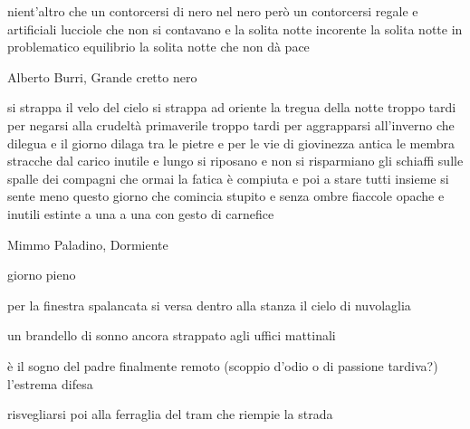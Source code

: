 \begin{poem}
	\begin{stanza}
		nient’altro che\verseline
		un contorcersi di nero nel nero\verseline
		però un contorcersi regale\verseline
		e artificiali lucciole che non si contavano\verseline
		e la solita notte incorente\verseline
		la solita notte in problematico equilibrio\verseline
		la solita notte che non dà pace
	\end{stanza}
\end{poem}

\clearpage


\begin{artItem}
	Alberto Burri, Grande cretto nero
\end{artItem}

\begin{poem}
	\begin{stanza}
		si strappa il velo del cielo\verseline
		si strappa ad oriente la tregua della notte\verseline
		troppo tardi per negarsi alla crudeltà primaverile\verseline
		troppo tardi per aggrapparsi all'inverno che dilegua\verseline
		e il giorno dilaga tra le pietre\verseline
		e per le vie di giovinezza antica\verseline
		le membra stracche dal carico inutile e lungo\verseline
		si riposano\verseline
		e non si risparmiano gli schiaffi sulle spalle dei compagni\verseline
		che ormai la fatica è compiuta\verseline
		e poi a stare tutti insieme si sente meno\verseline
		questo giorno che comincia stupito e senza ombre\verseline
		fiaccole opache e inutili\verseline
		estinte a una a una\verseline
		con gesto di carnefice
	\end{stanza}
\end{poem}

\clearpage


\begin{artItem}
	Mimmo Paladino, Dormiente
\end{artItem}

\begin{poem}
	\begin{stanza}
		giorno pieno
	\end{stanza}

	\begin{stanza}
		per la finestra spalancata\verseline
		si versa dentro alla stanza\verseline
		il cielo di nuvolaglia
	\end{stanza}

	\begin{stanza}
		un brandello di sonno ancora\verseline
		strappato agli uffici mattinali
	\end{stanza}

	\begin{stanza}
		è il sogno del padre\verseline
		finalmente remoto\verseline
		(scoppio d’odio o di passione tardiva?)\verseline
		l’estrema difesa
	\end{stanza}

	\begin{stanza}
		risvegliarsi poi alla ferraglia\verseline
		del tram\verseline
		che riempie la strada
	\end{stanza}
\end{poem}

